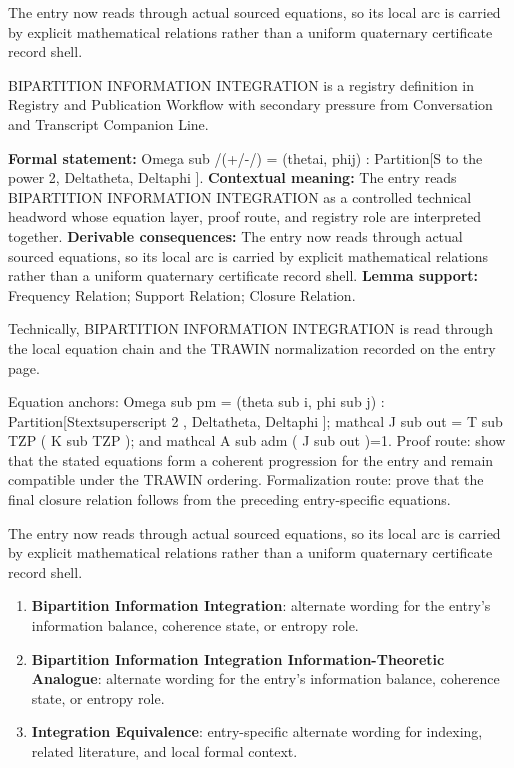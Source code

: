 The entry now reads through actual sourced equations, so its local arc is carried by explicit mathematical relations rather than a uniform quaternary certificate record shell.
\clearpage


\begingroup\small
{}
BIPARTITION INFORMATION INTEGRATION is a registry definition in Registry and Publication Workflow with secondary pressure from Conversation and Transcript Companion Line.

\begingroup\footnotesize\setlength{\emergencystretch}{3em}\sloppy
\textbf{Formal statement:} Omega sub /(+/-/) = (thetai, phij) : Partition[S to the power 2, Deltatheta, Deltaphi ]. \textbf{Contextual meaning:} The entry reads BIPARTITION INFORMATION INTEGRATION as a controlled technical headword whose equation layer, proof route, and registry role are interpreted together. \textbf{Derivable consequences:} The entry now reads through actual sourced equations, so its local arc is carried by explicit mathematical relations rather than a uniform quaternary certificate record shell. \textbf{Lemma support:} Frequency Relation; Support Relation; Closure Relation.\par
\endgroup

Technically, BIPARTITION INFORMATION INTEGRATION is read through the local equation chain and the TRAWIN normalization recorded on the entry page.

Equation anchors: Omega sub pm = (theta sub i, phi sub j) : Partition[Stextsuperscript 2 , Deltatheta, Deltaphi ]; mathcal J sub out = T sub TZP ( K sub TZP ); and mathcal A sub adm ( J sub out )=1. Proof route: show that the stated equations form a coherent progression for the entry and remain compatible under the TRAWIN ordering. Formalization route: prove that the final closure relation follows from the preceding entry-specific equations.

The entry now reads through actual sourced equations, so its local arc is carried by explicit mathematical relations rather than a uniform quaternary certificate record shell.
\endgroup

\begin{enumerate}[leftmargin=1.6em,itemsep=6pt,topsep=4pt]
\item \textbf{Bipartition Information Integration}: alternate wording for the entry's information balance, coherence state, or entropy role.
\item \textbf{Bipartition Information Integration Information-Theoretic Analogue}: alternate wording for the entry's information balance, coherence state, or entropy role.
\item \textbf{Integration Equivalence}: entry-specific alternate wording for indexing, related literature, and local formal context.
\end{enumerate}

